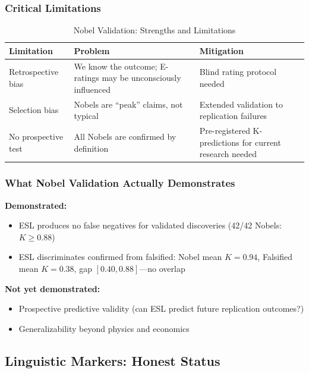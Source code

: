 \documentclass[11pt,a4paper]{article}
\begin{document}
\subsubsection{Critical Limitations}

\begin{table}[h]
\centering
\caption{Nobel Validation: Strengths and Limitations}
\label{tab:nobel-limits}
\begin{tabular}{p{4cm}p{5cm}p{4.5cm}}
\toprule
\textbf{Limitation} & \textbf{Problem} & \textbf{Mitigation} \\
\midrule
Retrospective bias & We know the outcome; E-ratings may be unconsciously influenced & Blind rating protocol needed \\
Selection bias & Nobels are ``peak'' claims, not typical & Extended validation to replication failures \\
No prospective test & All Nobels are confirmed by definition & Pre-registered K-predictions for current research needed \\
\bottomrule
\end{tabular}
\end{table}

\subsubsection{What Nobel Validation Actually Demonstrates}

\begin{resultbox}
\textbf{Demonstrated:}
\begin{itemize}
    \item ESL produces no false negatives for validated discoveries (42/42 Nobels: $K \geq 0.88$)
    \item ESL discriminates confirmed from falsified: Nobel mean $K = 0.94$, Falsified mean $K = 0.38$, gap $[0.40, 0.88]$---no overlap
\end{itemize}

\textbf{Not yet demonstrated:}
\begin{itemize}
    \item Prospective predictive validity (can ESL predict future replication outcomes?)
    \item Generalizability beyond physics and economics
\end{itemize}
\end{resultbox}

\subsection{Linguistic Markers: Honest Status}
\end{document}
